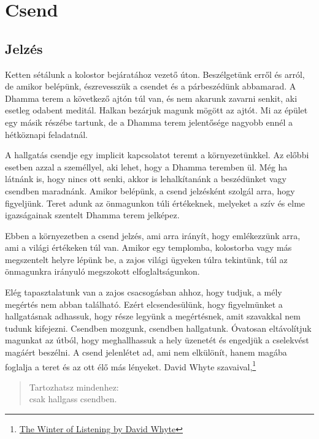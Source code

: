 \chapter{Csend}

\section{Jelzés}


\noindent Ketten sétálunk a kolostor bejáratához vezető úton.
Beszélgetünk erről és arról, de amikor belépünk, észrevesszük a csendet
és a párbeszédünk abbamarad. A Dhamma terem a következő ajtón túl van,
és nem akarunk zavarni senkit, aki esetleg odabent meditál. Halkan
bezárjuk magunk mögött az ajtót. Mi az épület egy másik részébe tartunk,
de a Dhamma terem jelentősége nagyobb ennél a hétköznapi feladatnál.

A hallgatás csendje egy implicit kapcsolatot teremt a környezetünkkel.
Az előbbi esetben azzal a személlyel, aki lehet, hogy a Dhamma teremben
ül. Még ha látnánk is, hogy nincs ott senki, akkor is lehalkítanánk a
beszédünket vagy csendben maradnánk. Amikor belépünk, a csend jelzésként
szolgál arra, hogy figyeljünk. Teret adunk az önmagunkon túli
értékeknek, melyeket a szív és elme igazságainak szentelt Dhamma terem
jelképez.

Ebben a környezetben a csend jelzés, ami arra irányít, hogy emlékezzünk
arra, ami a világi értékeken túl van. Amikor egy templomba, kolostorba
vagy más megszentelt helyre lépünk be, a zajos világi ügyeken túlra
tekintünk, túl az önmagunkra irányuló megszokott elfoglaltságunkon.

Elég tapasztalatunk van a zajos csacsogásban ahhoz, hogy tudjuk, a mély
megértés nem abban található. Ezért elcsendesülünk, hogy figyelmünket a
hallgatásnak adhassuk, hogy része legyünk a megértésnek, amit szavakkal
nem tudunk kifejezni. Csendben mozgunk, csendben hallgatunk. Óvatosan
eltávolítjuk magunkat az útból, hogy meghallhassuk a hely üzenetét és
engedjük a cselekvést magáért beszélni. A csend jelenlétet ad, ami nem
elkülönít, hanem magába foglalja a teret és az ott élő más lényeket.
David Whyte szavaival,\footnote{\href{https://www.goodreads.com/quotes/10119971-the-winter-of-listening-no-one-but-me-by-the}{The
  Winter of Listening by David Whyte}}

\begin{quote}
Tartozhatsz mindenhez:\\
csak hallgass csendben.
\end{quote}

